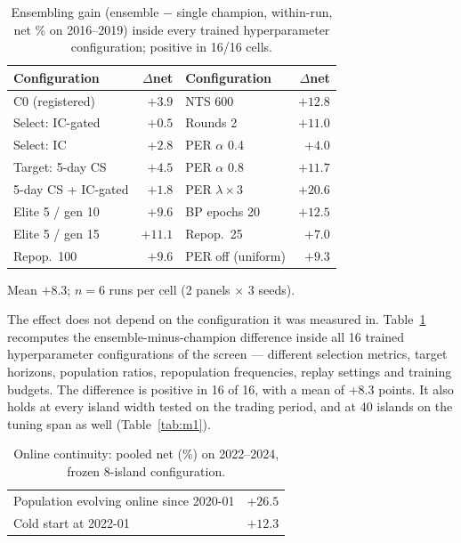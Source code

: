 \begin{table}[t]
\centering
\small
\begin{tabular}{@{}lr@{\quad}lr@{}}
\toprule
Configuration & $\Delta$net & Configuration & $\Delta$net \\
\midrule
C0 (registered)      & $+3.9$  & NTS 600            & $+12.8$ \\
Select: IC-gated     & $+0.5$  & Rounds 2           & $+11.0$ \\
Select: IC           & $+2.8$  & PER $\alpha$ 0.4   & $+4.0$  \\
Target: 5-day CS     & $+4.5$  & PER $\alpha$ 0.8   & $+11.7$ \\
5-day CS + IC-gated  & $+1.8$  & PER $\lambda{\times}3$ & $+20.6$ \\
Elite 5 / gen 10     & $+9.6$  & BP epochs 20       & $+12.5$ \\
Elite 5 / gen 15     & $+11.1$ & Repop.\ 25         & $+7.0$  \\
Repop.\ 100          & $+9.6$  & PER off (uniform)  & $+9.3$  \\
\bottomrule
\end{tabular}
\par\smallskip
{\footnotesize Mean $+8.3$; $n{=}6$ runs per cell (2 panels $\times$ 3
seeds).\par}
\caption{Ensembling gain (ensemble $-$ single champion, within-run, net \%
on 2016--2019) inside every trained hyperparameter configuration; positive
in 16/16 cells.}
\label{tab:invariance}
\end{table}

The effect does not depend on the configuration it was measured in.
Table~\ref{tab:invariance} recomputes the ensemble-minus-champion
difference inside all 16 trained hyperparameter configurations of the
screen --- different selection metrics, target horizons, population
ratios, repopulation frequencies, replay settings and training budgets.
The difference is positive in 16 of 16, with a mean of $+8.3$ points.
It also holds at every island width tested on the trading period, and at
40 islands on the tuning span as well (Table~\ref{tab:m1}).


\begin{table}[t]
\centering
\small
\begin{tabular}{@{}lr@{}}
\toprule
Population evolving online since 2020-01 & $+26.5$ \\
Cold start at 2022-01                     & $+12.3$ \\
\bottomrule
\end{tabular}
\caption{Online continuity: pooled net (\%) on 2022--2024, frozen 8-island
configuration.}
\label{tab:continuity}
\end{table}

